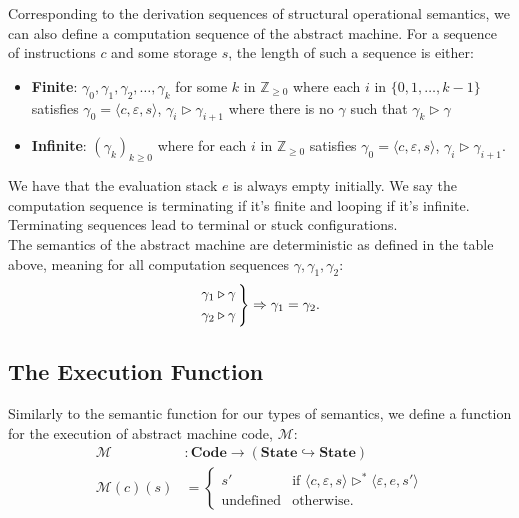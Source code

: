 \documentclass[a4paper, 12pt, twoside]{article}
\begin{document}
Corresponding to the derivation sequences of structural operational semantics,
we can also define a computation sequence of the abstract machine. For a 
sequence of instructions $c$ and some storage $s$, the length of such a sequence 
is either: \begin{itemize}
  \item \textbf{Finite}: $\gamma_0, \gamma_1, \gamma_2, \ldots, \gamma_k$
  for some $k$ in $\mathbb{Z}_{\geq 0}$ where each $i$ in $\{0, 1, \ldots, k - 1\}$ satisfies
  $\gamma_0 = \langle c, \varepsilon, s \rangle$, $\gamma_i \triangleright \gamma_{i + 1}$ where
  there is no $\gamma$ such that $\gamma_k \triangleright \gamma$
  \item \textbf{Infinite}: $(\gamma_k)_{k \geq 0}$ where 
  for each $i$ in $\mathbb{Z}_{\geq 0}$ satisfies 
  $\gamma_0 = \langle c, \varepsilon, s \rangle$, $\gamma_i \triangleright \gamma_{i + 1}$.
\end{itemize} We have that the evaluation stack $e$ is always empty
initially. We say the computation sequence is terminating if it's finite
and looping if it's infinite. Terminating sequences lead to terminal or stuck
configurations.
\\[\baselineskip]
The semantics of the abstract machine are deterministic as defined
in the table above, meaning for all
computation sequences $\gamma, \gamma_1, \gamma_2$: \begin{gather*}
  \begin{rcases*}
    \gamma_1 \triangleright \gamma \, \\
    \gamma_2 \triangleright \gamma \,
  \end{rcases*} \Rightarrow \gamma_1 = \gamma_2.
\end{gather*}

\subsection{The Execution Function}

Similarly to the semantic function for our types of semantics,
we define a function for the execution of abstract machine code, 
$\mathcal{M}$: \begin{align*}
  \mathcal{M} &: \textbf{Code} \to (\textbf{State} \hookrightarrow \textbf{State}) \\
  \mathcal{M}(c)(s) &= \begin{cases}
    s' & \text{if } \langle c, \varepsilon, s \rangle \triangleright^* \langle \varepsilon, e, s' \rangle\\
    \text{undefined} & \text{otherwise.}
  \end{cases}
\end{align*}
\end{document}
